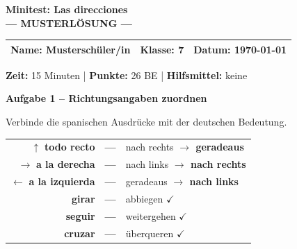 \documentclass[11pt, a4paper]{article}
\newcommand{\fachfarbe}{spanisch}
\newcommand{\thema}{Minitest: Las direcciones}
\newcommand{\klasse}{7}
\newcommand{\maxpunkte}{26}
\newcommand{\zeit}{15 Minuten}
\newcommand{\datum}{\today}
\newcommand{\punktebox}[1]{\hfill\fbox{\small \_\_\_/#1}}
\newcommand{\lsg}[1]{\textcolor{loesung}{\textbf{#1}}}
\newenvironment{aufgabe}[1]{%
    \needspace{5\baselineskip}%
    \nopagebreak[4]%
    \vspace{10pt}
    \noindent\textbf{\textcolor{\fachfarbe}{Aufgabe #1}}
    \nopagebreak[4]%
    \vspace{5pt}
    \nopagebreak[4]%
    \begin{list}{}{\leftmargin=0pt}
    \item[]
}{%
    \end{list}
}
\newcommand{\es}[1]{\textcolor{\fachfarbe}{\textbf{#1}}}
\begin{document}

\begin{center}
    {\Large\bfseries\textcolor{\fachfarbe}{\thema}}\\[0.3em]
    {\large\textcolor{loesung}{\textbf{--- MUSTERLÖSUNG ---}}}
\end{center}

\vspace{5pt}

\noindent
\begin{tabularx}{\textwidth}{|X|X|X|}
\hline
\textbf{Name:} \lsg{Musterschüler/in} &
\textbf{Klasse:} \klasse &
\textbf{Datum:} \datum \\
\hline
\end{tabularx}

\vspace{10pt}

\begin{infobox}
\textbf{Zeit:} \zeit{} | \textbf{Punkte:} \maxpunkte{} BE | \textbf{Hilfsmittel:} keine
\end{infobox}

\vspace{15pt}


\begin{aufgabe}{1 -- Richtungsangaben zuordnen}
Verbinde die spanischen Ausdrücke mit der deutschen Bedeutung. \punktebox{6}
\end{aufgabe}

\begin{center}
\begin{tabular}{rcl}
$\uparrow$ \es{todo recto} & \lsg{---} & nach rechts \lsg{$\rightarrow$ geradeaus} \\[0.8em]
$\rightarrow$ \es{a la derecha} & \lsg{---} & nach links \lsg{$\rightarrow$ nach rechts} \\[0.8em]
$\leftarrow$ \es{a la izquierda} & \lsg{---} & geradeaus \lsg{$\rightarrow$ nach links} \\[0.8em]
\es{girar} & \lsg{---} & abbiegen \lsg{$\checkmark$} \\[0.8em]
\es{seguir} & \lsg{---} & weitergehen \lsg{$\checkmark$} \\[0.8em]
\es{cruzar} & \lsg{---} & überqueren \lsg{$\checkmark$} \\
\end{tabular}
\end{center}
\end{document}
